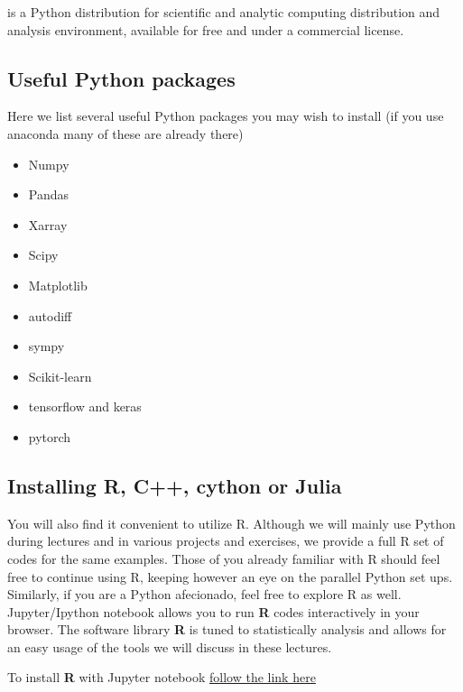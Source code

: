 \documentclass[%
oneside,                 %
final,                   %
10pt]{article}
\begin{document}
\noindent
is a Python
distribution for scientific and analytic computing distribution and
analysis environment, available for free and under a commercial
license.

\subsection{Useful Python packages}
Here we list several useful Python packages you may wish to install (if you use anaconda many of these are already there)

\begin{itemize}
\item Numpy

\item Pandas

\item Xarray

\item Scipy

\item Matplotlib

\item autodiff

\item sympy

\item Scikit-learn

\item tensorflow and keras

\item pytorch
\end{itemize}

\noindent
\subsection{Installing R, C++, cython or Julia}

You will also find it convenient to utilize R. Although we will mainly
use Python during lectures and in various projects and exercises, we
provide a full R set of codes for the same examples. Those of you
already familiar with R should feel free to continue using R, keeping
however an eye on the parallel Python set ups. Similarly, if you are a
Python afecionado, feel free to explore R as well.  Jupyter/Ipython
notebook allows you to run \textbf{R} codes interactively in your
browser. The software library \textbf{R} is tuned to statistically analysis
and allows for an easy usage of the tools we will discuss in these
lectures.

To install \textbf{R} with Jupyter notebook 
\href{{https://mpacer.org/maths/r-kernel-for-ipython-notebook}}{follow the link here}
\end{document}
